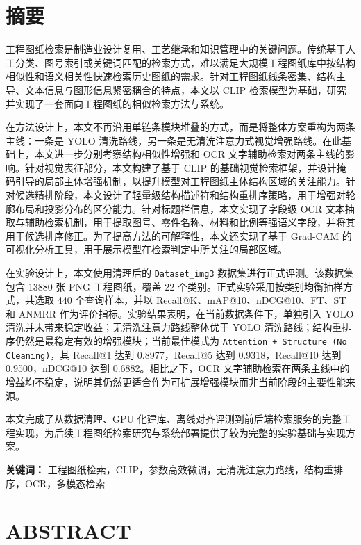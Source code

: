 \chapter*{摘要}

工程图纸检索是制造业设计复用、工艺继承和知识管理中的关键问题。传统基于人工分类、图号索引或关键词匹配的检索方式，难以满足大规模工程图纸库中按结构相似性和语义相关性快速检索历史图纸的需求。针对工程图纸线条密集、结构主导、文本信息与图形信息紧密耦合的特点，本文以 CLIP 检索模型为基础，研究并实现了一套面向工程图纸的相似检索方法与系统。

在方法设计上，本文不再沿用单链条模块堆叠的方式，而是将整体方案重构为两条主线：一条是 YOLO 清洗路线，另一条是无清洗注意力式视觉增强路线。在此基础上，本文进一步分别考察结构相似性增强和 OCR 文字辅助检索对两条主线的影响。针对视觉表征部分，本文构建了基于 CLIP 的基础视觉检索框架，并设计掩码引导的局部主体增强机制，以提升模型对工程图纸主体结构区域的关注能力。针对候选精排阶段，本文设计了轻量级结构描述符和结构重排序策略，用于增强对轮廓布局和投影分布的区分能力。针对标题栏信息，本文实现了字段级 OCR 文本抽取与辅助检索机制，用于提取图号、零件名称、材料和比例等强语义字段，并将其用于候选排序修正。为了提高方法的可解释性，本文还实现了基于 Grad-CAM 的可视化分析工具，用于展示模型在检索判定中所关注的局部区域。

在实验设计上，本文使用清理后的 \texttt{Dataset\_img3} 数据集进行正式评测。该数据集包含 13880 张 PNG 工程图纸，覆盖 22 个类别。正式实验采用按类别均衡抽样方式，共选取 440 个查询样本，并以 Recall@K、mAP@10、nDCG@10、FT、ST 和 ANMRR 作为评价指标。实验结果表明，在当前数据条件下，单独引入 YOLO 清洗并未带来稳定收益；无清洗注意力路线整体优于 YOLO 清洗路线；结构重排序仍然是最稳定有效的增强模块；当前最佳模式为 \texttt{Attention + Structure (No Cleaning)}，其 Recall@1 达到 0.8977，Recall@5 达到 0.9318，Recall@10 达到 0.9500，nDCG@10 达到 0.6882。相比之下，OCR 文字辅助检索在两条主线中的增益均不稳定，说明其仍然更适合作为可扩展增强模块而非当前阶段的主要性能来源。

本文完成了从数据清理、GPU 化建库、离线对齐评测到前后端检索服务的完整工程实现，为后续工程图纸检索研究与系统部署提供了较为完整的实验基础与实现方案。

\noindent\textbf{关键词：} 工程图纸检索，CLIP，参数高效微调，无清洗注意力路线，结构重排序，OCR，多模态检索

\chapter*{ABSTRACT}

